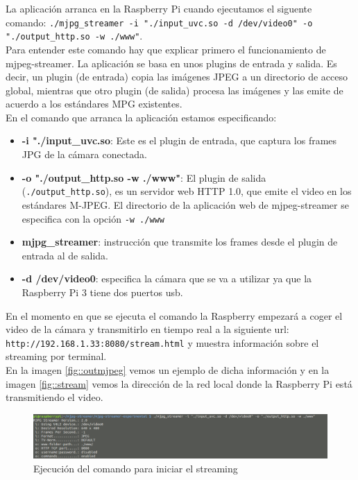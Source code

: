 \documentclass[twoside, 11pt]{epstfg}
\begin{document}
La aplicación arranca en la Raspberry Pi cuando ejecutamos el siguente comando: \texttt{./mjpg\_streamer -i "./input\_uvc.so -d /dev/video0" -o "./output\_http.so -w ./www"}.\\Para entender este comando hay que explicar primero el funcionamiento de mjpeg-streamer. La aplicación se basa en unos plugins de entrada y salida. Es decir, un plugin (de entrada) copia las imágenes JPEG a un directorio de acceso global, mientras que otro plugin (de salida) procesa las imágenes y las emite de acuerdo a los estándares MPG existentes.\\ En el comando que arranca la aplicación estamos especificando:
\begin{itemize}
	\item \textbf{ -i "./input\_uvc.so}: Este es el plugin de entrada, que captura los frames JPG de la cámara conectada.
	\item \textbf{-o "./output\_http.so -w ./www"}: El plugin de salida (\texttt{./output\_http.so}), es un servidor web HTTP 1.0, que emite el video en los estándares M-JPEG. El directorio de la aplicación web de mjpeg-streamer se especifica con la opción \texttt{-w ./www}
	\item \textbf{mjpg\_streamer}: instrucción que transmite los frames desde el plugin de entrada al de salida.
	\item \textbf{-d /dev/video0}: especifica la cámara que se va a utilizar ya que la Raspberry Pi 3 tiene dos puertos usb.
\end{itemize}

En el momento en que se ejecuta el comando la Raspberry empezará a coger el video de la cámara y transmitirlo en tiempo real a la siguiente url: \texttt{http://192.168.1.33:8080/stream.html} y muestra información sobre el streaming por terminal.\\
En la imagen \ref{fig::outmjpeg} vemos un ejemplo de dicha información y en la imagen \ref{fig::stream} vemos la dirección de la red local donde la Raspberry Pi está transmitiendo el video.

\begin{figure}[H]
	\centerline{
		\mbox{\includegraphics[width=.80\textwidth]{images/Streamingcomando.png}}
	}
	\caption{Ejecución del comando para iniciar el streaming}
\end{figure}\label{fig::outmjpeg}
\end{document}
